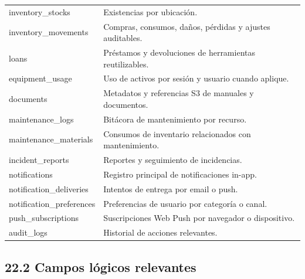 \documentclass[12pt]{article}
\begin{document}
\begin{longtable}{p{4cm} p{9cm}}
inventory\_stocks & Existencias por ubicación. \\
inventory\_movements & Compras, consumos, daños, pérdidas y ajustes auditables. \\
loans & Préstamos y devoluciones de herramientas reutilizables. \\
equipment\_usage & Uso de activos por sesión y usuario cuando aplique. \\
documents & Metadatos y referencias S3 de manuales y documentos. \\
maintenance\_logs & Bitácora de mantenimiento por recurso. \\
maintenance\_materials & Consumos de inventario relacionados con mantenimiento. \\
incident\_reports & Reportes y seguimiento de incidencias. \\
notifications & Registro principal de notificaciones in-app. \\
notification\_deliveries & Intentos de entrega por email o push. \\
notification\_preferences & Preferencias de usuario por categoría o canal. \\
push\_subscriptions & Suscripciones Web Push por navegador o dispositivo. \\
audit\_logs & Historial de acciones relevantes. \\
\bottomrule
\end{longtable}
\normalsize

\subsection*{22.2 Campos lógicos relevantes}
\end{document}
